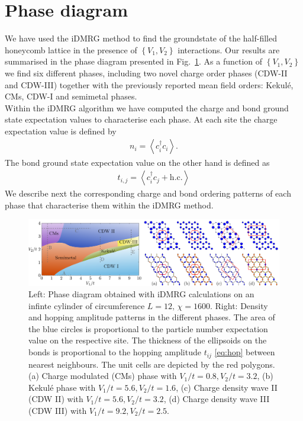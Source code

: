 \documentclass[aps,prx,10pt,twocolumn,floatfix,superscriptaddress,showpacs,numerical,footinbib]{revtex4-1}
\begin{document}
\section{\label{sec:phasediagram}Phase diagram}
%
We have used the iDMRG method to find the groundstate of the half-filled honeycomb lattice in the presence of 
$\left\lbrace V_{1},V_{2}\right\rbrace$ interactions.
%
Our results are summarised in the phase diagram presented in Fig.~\ref{fig:phase diagram}.
%
As a function of $\left\lbrace V_{1},V_{2}\right\rbrace$ we find six different phases, 
including two novel charge order phases (CDW-II and CDW-III) together with the previously 
reported mean field orders: Kekul\'{e}, CMs, CDW-I and semimetal phases.\\
%
%
Within the iDMRG algorithm we have computed the charge and bond ground state expectation values
to characterise each phase.
%
At each site the charge expectation value is defined by 
%
\begin{eqnarray}
\label{eq:charge}
n_{i}=\left\langle c^{\dagger}_{i}c_{i}\right\rangle.
\end{eqnarray}
%
The bond ground state expectation value on the other hand is defined as
%
\begin{eqnarray}
\label{eq:bond}
t_{i,j}=\left\langle c^{\dagger}_{i}c_{j}+\mathrm{h.c.}\right\rangle
\end{eqnarray}
%
%
We describe next the corresponding charge and bond ordering patterns of each phase 
that characterise them within the iDMRG method.

\begin{figure}
 \includegraphics[width=\textwidth]{pdf/phase_diagram_ext.pdf}
 \caption{Left: Phase diagram obtained with iDMRG calculations on an infinte cylinder of circumference $L=12, \, \chi = 1600$. 
 Right: Density and hopping amplitude patterns in the different phases. 
 The area of the blue circles is proportional to the particle number expectation value on the respective site. 
 The thickness of the ellipsoids on the bonds is proportional to the hopping amplitude $t_{ij}$ \eqref{eq:hop} between nearest neighbours.
 The unit cells are depicted by the red polygons. 
 (a) Charge modulated (CMs) phase with $V_1/t = 0.8, V_2/t = 3.2 $, (b) Kekul\'e phase with $V_1/t = 5.6, V_2/t = 1.6 $, (c) Charge density wave II (CDW II) with $V_1/t = 5.6, V_2/t = 3.2$,  (d) Charge density wave III (CDW III) with $V_1/t = 9.2, V_2/t = 2.5$. 
 \label{fig:phase diagram}}
\end{figure}
\end{document}
